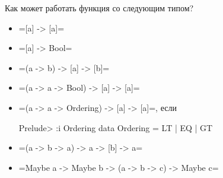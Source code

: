 \documentclass{beamer}
\begin{document}
\begin{frame}[fragile]{Как может работать функция со следующим типом?}
\begin{itemize}
 \item [{\Large \faQuestion}] \hsinline=[a] -> [a]=
 \item [{\Large \faQuestion}] \hsinline=[a] -> Bool=
 \item [{\Large \faQuestion}] \hsinline=(a -> b) -> [a] -> [b]=
 \item [{\Large \faQuestion}] \hsinline=(a -> a -> Bool) -> [a] -> [a]=
 \item [{\Large \faQuestion}] \hsinline=(a -> a -> Ordering) -> [a] -> [a]=, если
\begin{hslisting}
Prelude> :i Ordering
data Ordering = LT | EQ | GT   
\end{hslisting}
 \item [{\Large \faQuestion}] \hsinline=(a -> b -> a) -> a -> [b] -> a=
 \item [{\Large \faQuestion}] \hsinline=Maybe a -> Maybe b -> (a -> b -> c) -> Maybe c=
\end{itemize}
\end{frame}
\end{document}
